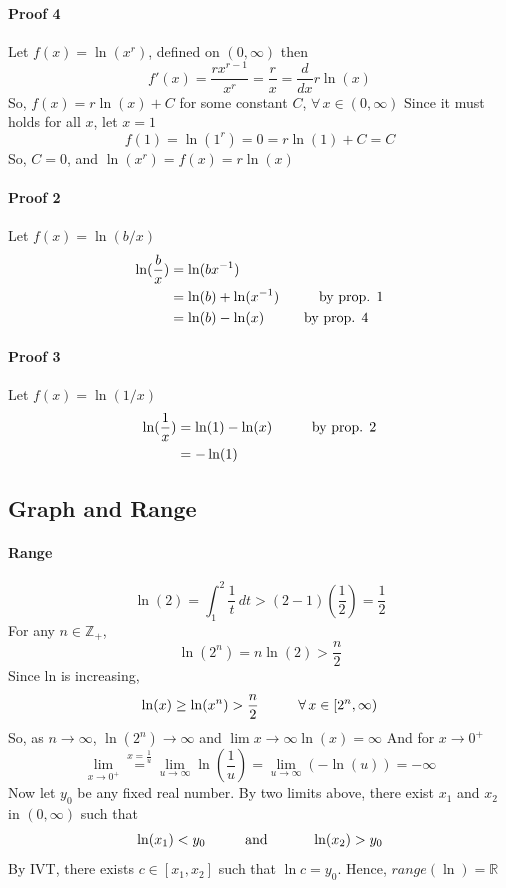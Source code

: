 \documentclass[12pt]{article}
\newcommand\tab[1][1cm]{\hspace*{#1}}
\begin{document}
\paragraph{Proof 4}
Let $f(x) = \ln(x^r)$, defined on $(0, \infty)$ then 
\[
    f'(x) = \frac{rx^{r - 1}}{x^r} = \frac{r}{x} = \frac{d}{dx} r \ln(x)
\]
So, $f(x) = r \ln(x) + C$ for some constant $C$, $\forall \, x \in (0, \infty)$
Since it must holds for all $x$, let $x = 1$
\[
    f(1) = \ln(1^r) = 0 = r \ln(1) + C = C
\]
So, $C = 0$, and $\ln(x^r) = f(x) = r \ln(x)$

\paragraph{Proof 2}
Let $f(x) = \ln(b/x)$
\begin{align*} 
     \ln(\frac{b}{x}) &= \ln(bx^{-1}) \\
     &= \ln(b) + \ln(x^{-1}) \textrm{\tab by prop. 1}\\ 
     &= \ln(b) - \ln(x) \textrm{\tab by prop. 4} \\
\end{align*}

\paragraph{Proof 3}
Let $f(x) = \ln(1/x)$
\begin{align*} 
    \ln(\frac{1}{x}) &= \ln(1) - \ln(x) \textrm{\tab by prop. 2} \\
    &= - \ln(1)
\end{align*}

\subsection{Graph and Range}
\paragraph{Range} 
\[
    \ln(2) = \int_1^2 \frac{1}{t} \, dt > (2 - 1)(\frac{1}{2}) = \frac{1}{2}
\]
For any $n \in \mathbb{Z}_{+}$, 
\[
    \ln(2^n) = n \ln(2) > \frac{n}{2}
\]
Since ln is increasing, 
\[
    \ln(x) \geq \ln(x^n) > \frac{n}{2} \textrm{\tab} \forall \, x \in [2^n, \infty)
\]
So, as $n \to \infty$, $\ln(2^n) \to \infty$ and $\lim{x \to \infty} \ln(x) = \infty$
And for $x \to 0^{+}$
\[
    \lim_{x\to 0^{ +}} \stackrel{x = \frac{1}{u}}{=} \lim_{u \to \infty} \ln\left(\frac{1}{u}\right) = \lim_{u \to \infty} ( -\ln(u)) = -\infty
\]
Now let $y_0$ be any fixed real number. By two limits above, there exist $x_1$ and $x_2$ in $(0, \infty)$ such that
\[
    \ln(x_1) < y_0 \textrm{\tab and \tab} \ln(x_2) > y_0
\]
By IVT, there exists $c \in [x_1, x_2]$ such that $\ln c = y_0$. Hence, $range(\ln) = \mathbb{R}$
\end{document}
